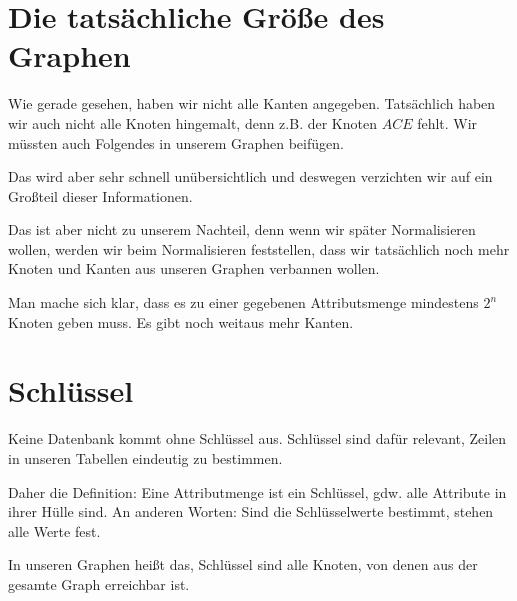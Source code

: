 \documentclass[a4paper, ngerman]{article}
\begin{document}
\section*{Die tatsächliche Größe des Graphen}
Wie gerade gesehen, haben wir nicht alle Kanten angegeben.
Tatsächlich haben wir auch nicht alle Knoten hingemalt,
denn z.B. der Knoten $ACE$ fehlt.
Wir müssten auch Folgendes in unserem Graphen beifügen.
\begin{center}
\end{center}
Das wird aber sehr schnell unübersichtlich
und deswegen verzichten wir auf
ein Großteil dieser Informationen.

Das ist aber nicht zu unserem Nachteil,
denn wenn wir später Normalisieren wollen,
werden wir beim Normalisieren feststellen,
dass wir tatsächlich noch mehr Knoten
und Kanten aus unseren Graphen verbannen wollen.

Man mache sich klar, dass es zu einer 
gegebenen Attributsmenge mindestens
$2^n$ Knoten geben muss.
Es gibt noch weitaus mehr Kanten.

\section*{Schlüssel}
Keine Datenbank kommt ohne Schlüssel aus.
Schlüssel sind dafür relevant,
Zeilen in unseren Tabellen eindeutig zu bestimmen.

Daher die Definition:
Eine Attributmenge ist ein Schlüssel,
gdw. alle Attribute in ihrer Hülle sind.
An anderen Worten: Sind die Schlüsselwerte bestimmt,
stehen alle Werte fest.

In unseren Graphen heißt das,
Schlüssel sind alle Knoten,
von denen aus der gesamte Graph erreichbar ist.
\end{document}
